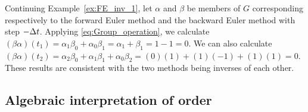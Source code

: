 \begin{example}\label{ex:FE_inv_2}
	Continuing Example~\ref{ex:FE_inv_1}, let $\alpha$ and $\beta$ be members of $G$ corresponding respectively to the forward Euler method and the backward Euler method with step $-\Delta t$. Applying \eqref{eq:Group_operation}, we calculate $(\beta\alpha)(t_1) =\alpha_1\beta_0 + \alpha_0\beta_1 = \alpha_1 + \beta_1 = 1 - 1 = 0$. We can also calculate $(\beta\alpha)(t_2) = \alpha_2\beta_0 + \alpha_1\beta_1 + \alpha_0\beta_2 =  (0)(1) + (1)(-1) + (1)(1) = 0$. These results are consistent with the two methods being inverses of each other.
\end{example}

\subsection{Algebraic interpretation of order}\label{sec:Algebraic_order}

